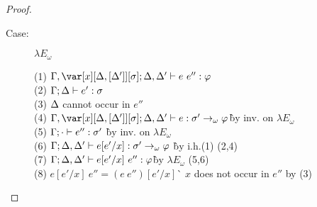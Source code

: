 \begin{proof}
\begin{description}
\begin{tabbing}
\end{tabbing}

\item[Case:] $\lambda E_\omega$
\begin{tabbing}
    (1) $\G, \xD; \D, \D' \vdash e~e'' : \vp$\\
    (2) $\Gamma; \Delta \vdash e' : \sigma$\\
    (3) $\Delta$ cannot occur in $e''$\\
    (4) $\G, \xD; \D, \D' \vdash e : \s' \to_\omega \vp$\` by inv. on $\lambda E_\omega$\\
    (5) $\Gamma; \cdot \vdash e'' : \sigma'$ \` by inv. on $\lambda E_\omega$\\
    (6) $\Gamma; \Delta, \Delta' \vdash e[e'/x] : \sigma' \to_\omega \varphi$ \` by i.h.(1) (2,4)\\
    (7) $\Gamma; \Delta, \Delta' \vdash e[e'/x]~e'' : \varphi$\` by $\lambda E_\omega$ (5,6)\\
    (8) $e[e'/x]~e'' = (e~e'')[e'/x]$\` $x$ does not occur in $e''$ by (3)\\
\end{tabbing}


\end{description}
\end{proof}
